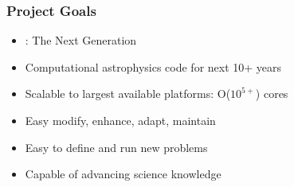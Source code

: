 \begin{frame}[fragile] \frametitle{Project Goals}
   \begin{itemize}
      \item{} \enzo: The Next Generation
      \item{} Computational astrophysics code for next 10+ years
      \item{} Scalable to largest available platforms: O($10^{5+}$)  cores
      \item{} Easy modify, enhance, adapt, maintain
      \item{} Easy to define and run new problems
      \item Capable of advancing science knowledge
   \end{itemize}
\end{frame}

